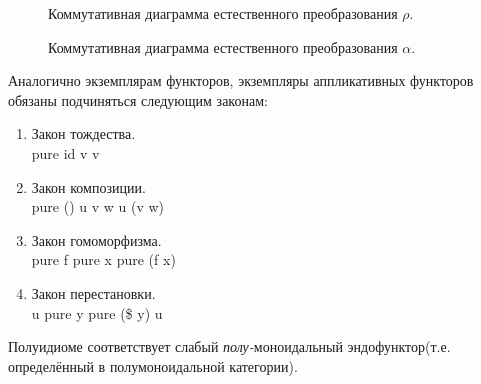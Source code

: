 \begin{figure}[h]
  \centering
    \caption{Коммутативная диаграмма естественного преобразования $\rho$.}
    \label{cd:monfunc-2}
\end{figure}

\begin{figure}[h]
  \centering
    \caption{Коммутативная диаграмма естественного преобразования $\alpha$.}
    \label{cd:monfunc-3}
\end{figure}

Аналогично экземплярам функторов, экземпляры аппликативных функторов обязаны подчиняться следующим законам:
\begin{enumerate}
  \item Закон тождества.\\ \<pure id \circledast v \equiv v\>
  \item Закон композиции.\\ \<pure (\circ) \circledast u \circledast v \circledast w \equiv u \circledast (v \circledast w)\>
  \item Закон гомоморфизма.\\ \<pure f \circledast pure x \equiv pure (f x)\>
  \item Закон перестановки.\\ \<u \circledast pure y \equiv pure (\$ y) \circledast u\>
\end{enumerate}

Полуидиоме соответствует слабый \emph{полу-}моноидальный эндофунктор(т.е. определённый в полумоноидальной категории).

